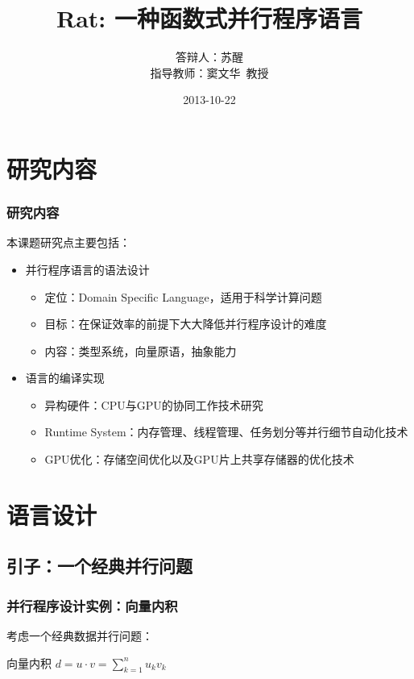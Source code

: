 \documentclass{beamer}
\title{Rat: 一种函数式并行程序语言}
\author[苏醒~pysuxing@gmail.com]{
\begin{tabular}{ll}
答辩人： & 苏醒 \\
指导教师： & 窦文华~教授
\end{tabular}
}
\institute{计算机所641教研室}
\date{2013-10-22}
\begin{document}
\setlength{\parindent}{0pt}
\begin{frame}
  \titlepage
\end{frame}

\begin{frame}
  \tableofcontents
\end{frame}

\section{研究内容}
\frame{\tableofcontents[currentsection]}
\begin{frame}
  \frametitle{研究内容}
  本课题研究点主要包括：
  \begin{itemize}
    \item 并行程序语言的语法设计
      \begin{itemize}
        \item 定位：Domain Specific Language，适用于科学计算问题
        \item 目标：在保证效率的前提下大大降低并行程序设计的难度
        \item 内容：类型系统，向量原语，抽象能力
      \end{itemize}
      \pause
    \item 语言的编译实现
      \begin{itemize}
        \item 异构硬件：CPU与GPU的协同工作技术研究
        \item Runtime System：内存管理、线程管理、任务划分等并行细节自动化技术
        \item GPU优化：存储空间优化以及GPU片上共享存储器的优化技术
      \end{itemize}
  \end{itemize}
\end{frame}

\section{语言设计}
\frame{\tableofcontents[currentsection]}
\subsection{引子：一个经典并行问题}
\begin{frame}[t]
  \frametitle{并行程序设计实例：向量内积}
  考虑一个经典数据并行问题：
  \begin{block}{向量内积}
    $d=u \cdot v = \sum_{k=1}^nu_kv_k$
  \end{block}

\end{frame}
\end{document}
